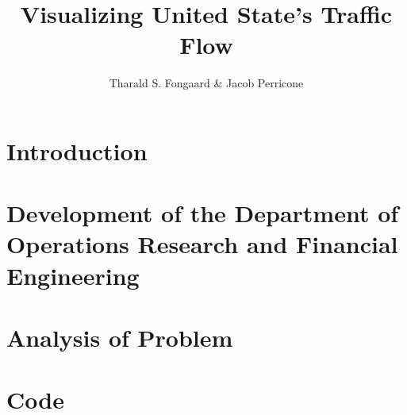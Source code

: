 \documentclass[12pt,lot,lof]{puthesis_undergraduate}
\title{Visualizing United State's Traffic Flow}
\author{Tharald S. Fongaard \& Jacob Perricone}
\begin{document}
\chapter{Introduction}\label{ch:intro}  %

\chapter{Development of the Department of Operations Research and Financial Engineering}  %


\chapter{Analysis of Problem}


\appendix
\chapter{Code}




 \label{bib}
\end{document}
